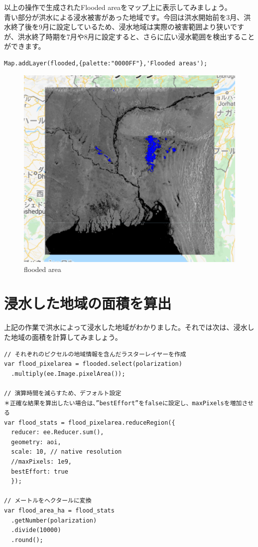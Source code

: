 \documentclass[
]{book}
\begin{document}
以上の操作で生成されたFlooded areaをマップ上に表示してみましょう。\\
青い部分が洪水による浸水被害があった地域です。今回は洪水開始前を3月、洪水終了後を9月に設定しているため、浸水地域は実際の被害範囲より狭いですが、洪水終了時期を7月や8月に設定すると、さらに広い浸水範囲を検出することができます。

\begin{verbatim}
Map.addLayer(flooded,{palette:"0000FF"},'Flooded areas');
\end{verbatim}

\begin{figure}
\centering
\includegraphics{images/flooded.png}
\caption{flooded area}
\end{figure}

\hypertarget{ux6d78ux6c34ux3057ux305fux5730ux57dfux306eux9762ux7a4dux3092ux7b97ux51fa}{%
\section{浸水した地域の面積を算出}\label{ux6d78ux6c34ux3057ux305fux5730ux57dfux306eux9762ux7a4dux3092ux7b97ux51fa}}

上記の作業で洪水によって浸水した地域がわかりました。それでは次は、浸水した地域の面積を計算してみましょう。

\begin{verbatim}
// それぞれのピクセルの地域情報を含んだラスターレイヤーを作成 
var flood_pixelarea = flooded.select(polarization)
  .multiply(ee.Image.pixelArea());

// 演算時間を減らすため、デフォルト設定
＊正確な結果を算出したい場合は、”bestEffort”をfalseに設定し、maxPixelsを増加させる
var flood_stats = flood_pixelarea.reduceRegion({
  reducer: ee.Reducer.sum(),              
  geometry: aoi,
  scale: 10, // native resolution 
  //maxPixels: 1e9,
  bestEffort: true
  });

// メートルをヘクタールに変換  
var flood_area_ha = flood_stats
  .getNumber(polarization)
  .divide(10000)
  .round(); 
\end{verbatim}
\end{document}
